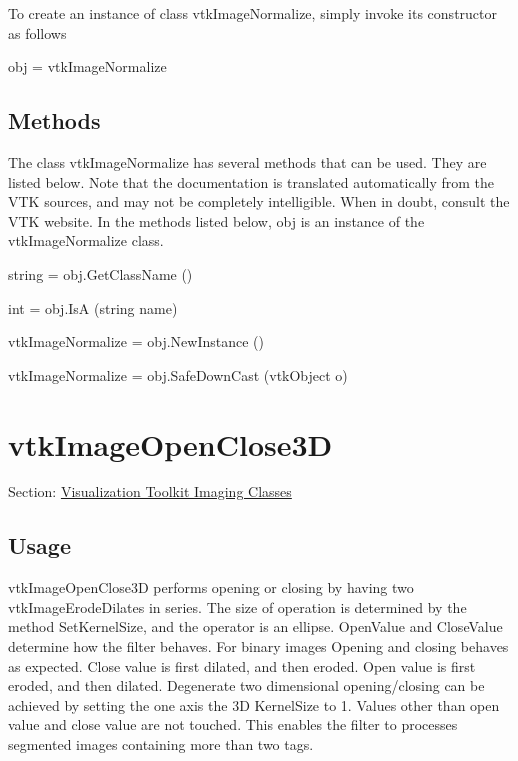 To create an instance of class vtk\-Image\-Normalize, simply invoke its constructor as follows \begin{DoxyVerb}  obj = vtkImageNormalize
\end{DoxyVerb}
 \hypertarget{vtkwidgets_vtkxyplotwidget_Methods}{}\subsection{Methods}\label{vtkwidgets_vtkxyplotwidget_Methods}
The class vtk\-Image\-Normalize has several methods that can be used. They are listed below. Note that the documentation is translated automatically from the V\-T\-K sources, and may not be completely intelligible. When in doubt, consult the V\-T\-K website. In the methods listed below, {\ttfamily obj} is an instance of the vtk\-Image\-Normalize class. 
\begin{DoxyItemize}
\item {\ttfamily string = obj.\-Get\-Class\-Name ()}  
\item {\ttfamily int = obj.\-Is\-A (string name)}  
\item {\ttfamily vtk\-Image\-Normalize = obj.\-New\-Instance ()}  
\item {\ttfamily vtk\-Image\-Normalize = obj.\-Safe\-Down\-Cast (vtk\-Object o)}  
\end{DoxyItemize}\hypertarget{vtkimaging_vtkimageopenclose3d}{}\section{vtk\-Image\-Open\-Close3\-D}\label{vtkimaging_vtkimageopenclose3d}
Section\-: \hyperlink{sec_vtkimaging}{Visualization Toolkit Imaging Classes} \hypertarget{vtkwidgets_vtkxyplotwidget_Usage}{}\subsection{Usage}\label{vtkwidgets_vtkxyplotwidget_Usage}
vtk\-Image\-Open\-Close3\-D performs opening or closing by having two vtk\-Image\-Erode\-Dilates in series. The size of operation is determined by the method Set\-Kernel\-Size, and the operator is an ellipse. Open\-Value and Close\-Value determine how the filter behaves. For binary images Opening and closing behaves as expected. Close value is first dilated, and then eroded. Open value is first eroded, and then dilated. Degenerate two dimensional opening/closing can be achieved by setting the one axis the 3\-D Kernel\-Size to 1. Values other than open value and close value are not touched. This enables the filter to processes segmented images containing more than two tags.


